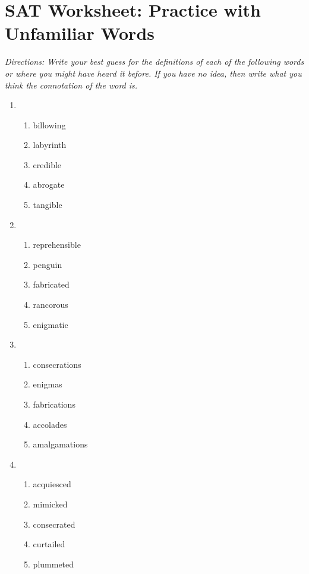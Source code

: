 \section{SAT Worksheet: Practice with Unfamiliar Words}

\textit{Directions: Write your best guess for the definitions of each of the following words or where you might have heard it before. If you have no idea, then write what you think the connotation of the word is.} 

\begin{enumerate}

\item   
\begin{enumerate}[label=(\Alph*)]
\item billowing  \hrulefill
\item labyrinth \hrulefill
\item credible \hrulefill
\item abrogate \hrulefill
\item tangible \hrulefill
\end{enumerate}

\item    
\begin{enumerate}[label=(\Alph*)] 
\item reprehensible \hrulefill
\item penguin  \hrulefill
\item fabricated \hrulefill
\item rancorous \hrulefill
\item enigmatic   \hrulefill
\end{enumerate}

\item 
\begin{enumerate} [label=(\Alph*)]
\item consecrations \hrulefill
\item enigmas \hrulefill
\item fabrications \hrulefill
\item accolades \hrulefill
\item amalgamations  \hrulefill
\end{enumerate}

\item 
\begin{enumerate} [label=(\Alph*)]
\item acquiesced \hrulefill
\item mimicked  \hrulefill
\item consecrated \hrulefill
\item curtailed \hrulefill
\item plummeted \hrulefill
\end{enumerate}

\end{enumerate}

